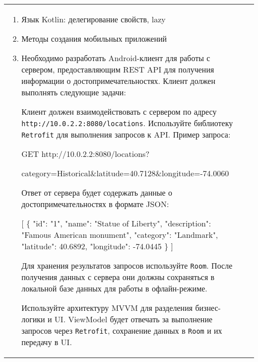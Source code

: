 \documentclass[a4paper]{article}
\begin{document}
\begin{tabular}{!{\vrule width 2pt}p{5cm}|p{6cm}|p{4cm}!{\vrule width 2pt}}
{\begin{minipage}{16cm}
\fontsize{14pt}{16pt}\selectfont\itshape
\begin{enumerate}
    \item Язык Kotlin: делегирование свойств, lazy
    \item Методы создания мобильных приложений
    \item %

Необходимо разработать Android-клиент для работы с сервером, предоставляющим REST API для получения информации о достопримечательностях. Клиент должен выполнять следующие задачи:


Клиент должен взаимодействовать с сервером по адресу \texttt{http://10.0.2.2:8080/locations}. Используйте библиотеку \texttt{Retrofit} для выполнения запросов к API. Пример запроса:

 GET http://10.0.2.2:8080/locations?

     category=Historical\&latitude=40.7128\&longitude=-74.0060 

Ответ от сервера будет содержать данные о достопримечательностях в формате JSON:

 [ \{ "id": "1", "name": "Statue of Liberty", "description": "Famous American monument",
     "category": "Landmark", "latitude": 40.6892, "longitude": -74.0445 \} ] 


Для хранения результатов запросов используйте \texttt{Room}. После получения данных с сервера они должны сохраняться в локальной базе данных для работы в офлайн-режиме.


Используйте архитектуру MVVM для разделения бизнес-логики и UI. ViewModel будет отвечать за выполнение запросов через \texttt{Retrofit}, сохранение данных в \texttt{Room} и их передачу в UI.


\end{enumerate}
\end{minipage}}
\end{tabular}
\end{document}
